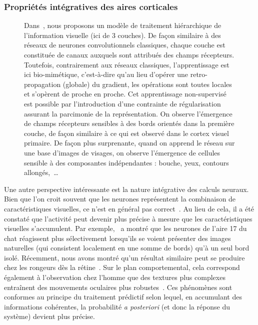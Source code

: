 \subsubsection{Propriétés intégratives des aires corticales}
\begin{figure}%
\caption{
Dans~\citep{BoutinFranciosiniChavaneRuffierPerrinet20}, nous proposons un
modèle de traitement hiérarchique de l'information visuelle (ici de 3 couches).
De façon similaire à des réseaux de neurones convolutionnels classiques,
chaque couche est constituée de canaux auxquels sont attribués des champs récepteurs.
Toutefois, contrairement aux réseaux classiques, l'apprentissage est ici bio-mimétique,
c'est-à-dire qu'au lieu d'opérer une retro-propagation (globale) du gradient,
les opérations sont toutes locales et s'opèrent de proche en proche.
Cet apprentissage non-supervisé est possible par l'introduction
d'une contrainte de régularisation assurant la parcimonie de la représentation.
On observe l'émergence de champs récepteurs sensibles à des bords orientés dans la première couche,
de façon similaire à ce qui est observé dans le cortex visuel primaire.
De façon plus surprenante, quand on apprend le réseau sur une base d'images de visages,
on observe l'émergence de cellules sensible à des composantes indépendantes : bouche, yeux, contours allongés,~\ldots
}
\label{fig:BoutinFranciosiniChavaneRuffierPerrinet19}
\end{figure}
Une autre perspective intéressante est la nature intégrative des calculs
neuraux. Bien que l'on croit souvent que les neurones représentent la
combinaison de caractéristiques visuelles, ce n'est en général pas
correct~\citep{Tring18}. Au lieu de cela, il a été constaté que
l'activité peut devenir plus précise à mesure que les caractéristiques
visuelles s'accumulent. Par exemple,~\citep{Baudot13} a montré que
les neurones de l'aire 17 du chat réagissent plus sélectivement
lorsqu'ils se voient présenter des images naturelles (qui consistent localement en une somme de bords) qu'à un seul bord isolé. Récemment,
nous avons montré qu'un résultat similaire peut se produire chez les rongeurs dès
la rétine~\citep{Ravello19}. Sur le plan comportemental, cela correspond
également à l'observation chez l'homme que des textures plus complexes
entraînent des mouvements oculaires plus robustes~\citep{Simoncini12}. Ces phénomènes sont conformes au principe du traitement prédictif
selon lequel, en accumulant des informations cohérentes, la probabilité
\emph{a posteriori} (et donc la réponse du système) devient plus
précise.

